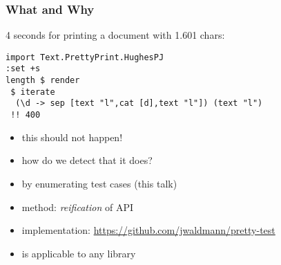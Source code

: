 \begin{frame}[fragile]
\frametitle{What and Why}
4 seconds for printing a document with 1.601 chars:
\begin{small}
\begin{verbatim}
import Text.PrettyPrint.HughesPJ
:set +s
length $ render
 $ iterate 
  (\d -> sep [text "l",cat [d],text "l"]) (text "l") 
 !! 400
\end{verbatim}
\end{small}

  \begin{itemize} %
  \item this should not happen!
  \item how do we detect that it does?
  \item by enumerating test cases (this talk)
  \item method: \emph{reification} of API
  \item implementation: \url{https://github.com/jwaldmann/pretty-test}
  \item is applicable to any library
  \end{itemize}

\end{frame}

